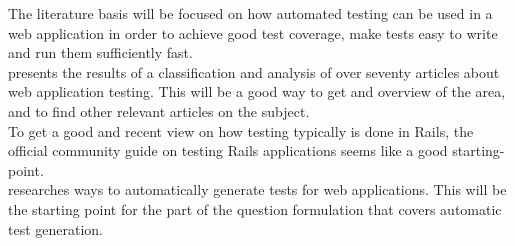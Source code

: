 
The literature basis will be focused on how automated testing can be used
in a web application in order to achieve good test coverage, make tests
easy to write and run them sufficiently fast.\\

\citet{article:mappingstudy} presents the results of a classification
and analysis of over seventy articles about web application testing. This
will be a good way to get and overview of the area, and to find other
relevant articles on the subject.\\

To get a good and recent view on how testing typically is done in Rails,
the official community guide on testing Rails applications seems like a
good starting-point.\\

\citet{article:test-generation-web} researches ways to automatically
generate tests for web applications. This will be the starting point for
the part of the question formulation that covers automatic test
generation.
